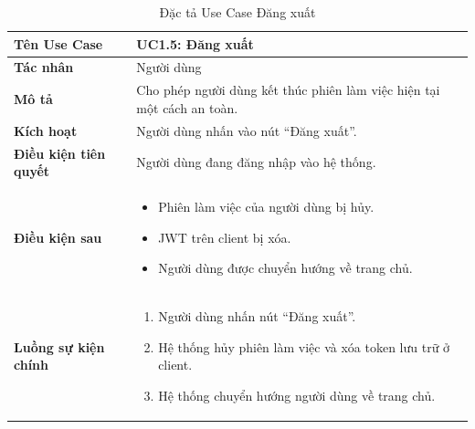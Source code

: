 \begin{table}[H]
\centering
\begin{tabularx}{\textwidth}{|l|X|}
\hline
\textbf{Tên Use Case} & \textbf{UC1.5: Đăng xuất} \\ \hline
\textbf{Tác nhân} & Người dùng \\ \hline
\textbf{Mô tả} & Cho phép người dùng kết thúc phiên làm việc hiện tại một cách an toàn. \\ \hline
\textbf{Kích hoạt} & Người dùng nhấn vào nút ``Đăng xuất''. \\ \hline
\textbf{Điều kiện tiên quyết} & Người dùng đang đăng nhập vào hệ thống. \\ \hline
\textbf{Điều kiện sau} & 
\begin{itemize}
    \item Phiên làm việc của người dùng bị hủy.
    \item JWT trên client bị xóa.
    \item Người dùng được chuyển hướng về trang chủ.
\end{itemize} \\ \hline
\textbf{Luồng sự kiện chính} & 
\begin{enumerate}
    \item Người dùng nhấn nút ``Đăng xuất''.
    \item Hệ thống hủy phiên làm việc và xóa token lưu trữ ở client.
    \item Hệ thống chuyển hướng người dùng về trang chủ.
\end{enumerate} \\ \hline
\end{tabularx}
\caption{Đặc tả Use Case Đăng xuất}
\end{table}

